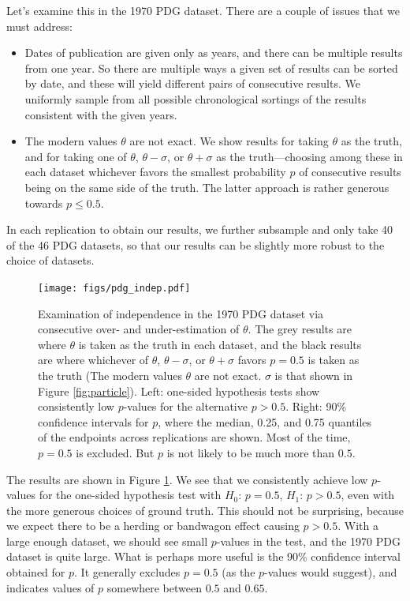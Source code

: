 \documentclass[letterpaper,12pt]{article}
\begin{document}
Let's examine this in the 1970 PDG dataset. There are a couple of issues that we must address:
\begin{itemize}
  \item Dates of publication are given only as years, and there can be multiple results from one year. So there are multiple ways a given set of results can be sorted by date, and these will yield different pairs of consecutive results. We uniformly sample from all possible chronological sortings of the results consistent with the given years.
  \item The modern values $\theta$ are not exact. We show results for taking $\theta$ as the truth, and for taking one of $\theta$, $\theta-\sigma$, or $\theta+\sigma$ as the truth---choosing among these in each dataset whichever favors the smallest probability $p$ of consecutive results being on the same side of the truth. The latter approach is rather generous towards $p\leq 0.5$.
\end{itemize}
In each replication to obtain our results, we further subsample and only take 40 of the 46 PDG datasets, so that our results can be slightly more robust to the choice of datasets.

\begin{figure}[htbp]
  \texttt{[image: figs/pdg\_indep.pdf]}
  \caption{Examination of independence in the 1970 PDG dataset via consecutive over- and under-estimation of $\theta$. The grey results are where $\theta$ is taken as the truth in each dataset, and the black results are where whichever of $\theta$, $\theta-\sigma$, or $\theta+\sigma$ favors $p=0.5$ is taken as the truth (The modern values $\theta$ are not exact. $\sigma$ is that shown in Figure \ref{fig:particle}). Left: one-sided hypothesis tests show consistently low $p$-values for the alternative $p>0.5$. Right: 90\% confidence intervals for $p$, where the median, 0.25, and 0.75 quantiles of the endpoints across replications are shown. Most of the time, $p=0.5$ is excluded. But $p$ is not likely to be much more than $0.5$.}
  \label{fig:pdg-indep}
\end{figure}

The results are shown in Figure \ref{fig:pdg-indep}. We see that we consistently achieve low $p$-values for the one-sided hypothesis test with $H_0$: $p=0.5$, $H_1$: $p>0.5$, even with the more generous choices of ground truth. This should not be surprising, because we expect there to be a herding or bandwagon effect causing $p>0.5$. With a large enough dataset, we should see small $p$-values in the test, and the 1970 PDG dataset is quite large. What is perhaps more useful is the 90\% confidence interval obtained for $p$. It generally excludes $p=0.5$ (as the $p$-values would suggest), and indicates values of $p$ somewhere between $0.5$ and $0.65$.
\end{document}
